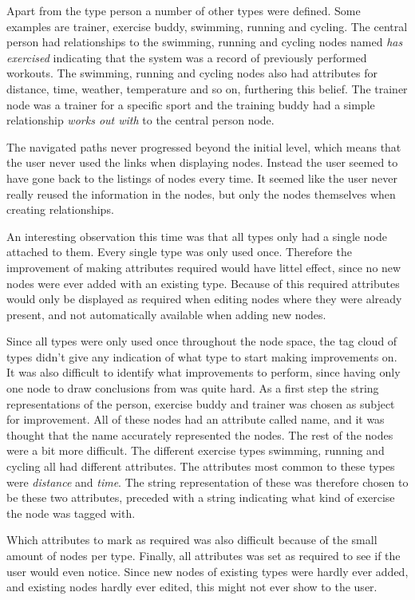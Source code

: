 \documentclass[a4paper]{report}
\begin{document}
Apart from the type person a number of other types were defined. Some examples are trainer, exercise buddy, swimming, running and cycling. The central person had relationships to the swimming, running and cycling nodes named \emph{has exercised} indicating that the system was a record of previously performed workouts. The swimming, running and cycling nodes also had attributes for distance, time, weather, temperature and so on, furthering this belief. The trainer node was a trainer for a specific sport and the training buddy had a simple relationship \emph{works out with} to the central person node.

The navigated paths never progressed beyond the initial level, which means that the user never used the links when displaying nodes. Instead the user seemed to have gone back to the listings of nodes every time. It seemed like the user never really reused the information in the nodes, but only the nodes themselves when creating relationships.

An interesting observation this time was that all types only had a single node attached to them. Every single type was only used once. Therefore the improvement of making attributes required would have littel effect, since no new nodes were ever added with an existing type. Because of this required attributes would only be displayed as required when editing nodes where they were already present, and not automatically available when adding new nodes.

Since all types were only used once throughout the node space, the tag cloud of types didn't give any indication of what type to start making improvements on. It was also difficult to identify what improvements to perform, since having only one node to draw conclusions from was quite hard. As a first step the string representations of the person, exercise buddy and trainer was chosen as subject for improvement. All of these nodes had an attribute called name, and it was thought that the name accurately represented the nodes. The rest of the nodes were a bit more difficult. The different exercise types swimming, running and cycling all had different attributes. The attributes most common to these types were \emph{distance} and \emph{time}. The string representation of these was therefore chosen to be these two attributes, preceded with a string indicating what kind of exercise the node was tagged with.

Which attributes to mark as required was also difficult because of the small amount of nodes per type. Finally, all attributes was set as required to see if the user would even notice. Since new nodes of existing types were hardly ever added, and existing nodes hardly ever edited, this might not ever show to the user.
\end{document}
